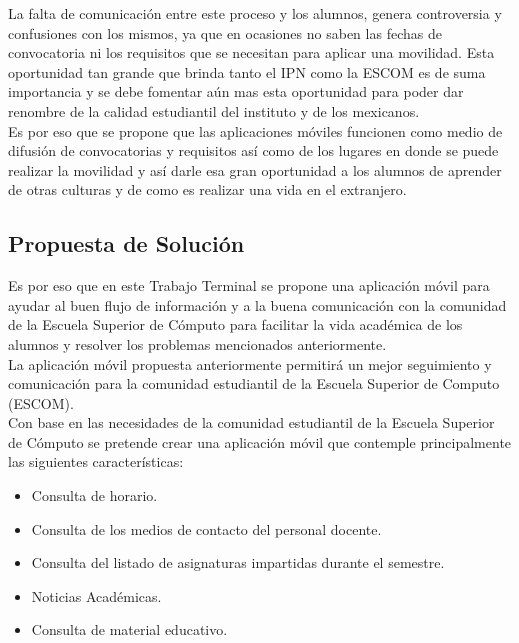 \begin{itemize}
		La falta de comunicación entre este proceso y los alumnos, genera controversia y confusiones con los mismos, ya que en ocasiones no saben las fechas de convocatoria ni los requisitos que se necesitan para aplicar una movilidad. Esta oportunidad tan grande que brinda tanto el IPN como la ESCOM es de suma importancia y se debe fomentar aún mas esta oportunidad para poder dar renombre de la calidad estudiantil del instituto y de los mexicanos.\\
		
		Es por eso que se propone que las aplicaciones móviles funcionen como medio de difusión de convocatorias y requisitos así como de los lugares en donde se puede realizar la movilidad y así darle esa gran oportunidad a los alumnos de aprender de otras culturas y de como es realizar una vida en el extranjero.\\
		
	\end{itemize}
	
	\subsection{Propuesta de Solución}
	
	Es por eso que en este Trabajo Terminal se propone una aplicación móvil para ayudar al buen flujo de información y a la buena comunicación con la comunidad de la Escuela Superior de Cómputo para facilitar la vida académica de los alumnos y resolver los problemas mencionados anteriormente.\\
	
	La aplicación móvil propuesta anteriormente permitirá un mejor seguimiento y comunicación para la comunidad estudiantil de la Escuela Superior de Computo (ESCOM).\\
	
	Con base en las necesidades de la comunidad estudiantil de la Escuela Superior de Cómputo se pretende crear una aplicación móvil que contemple principalmente las siguientes características:
	\begin{itemize}
		\item Consulta de horario.
		\item Consulta de los medios de contacto del personal docente.
		\item Consulta del listado de asignaturas impartidas durante el semestre.
		\item Noticias Académicas.
		\item  Consulta de material educativo.
	\end{itemize}

